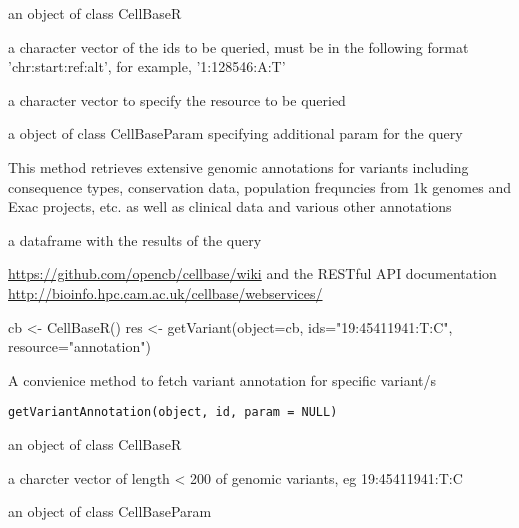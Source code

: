 \documentclass[letterpaper]{book}
\begin{document}
%
\begin{Arguments}
\begin{ldescription}
\item[\code{object}] an object of class CellBaseR

\item[\code{ids}] a character vector of the ids to be queried, must be in the 
following format 'chr:start:ref:alt', for 
example, '1:128546:A:T'

\item[\code{resource}] a character vector to specify the resource to be queried

\item[\code{param}] a object of class CellBaseParam specifying additional param
for the query
\end{ldescription}
\end{Arguments}
%
\begin{Details}\relax
This method retrieves extensive genomic annotations for variants
including consequence types, conservation data, population frequncies from 1k
genomes and Exac projects, etc.
as well as clinical data and various other annotations
\end{Details}
%
\begin{Value}
a dataframe with the results of the query
\end{Value}
%
\begin{SeeAlso}\relax
\url{https://github.com/opencb/cellbase/wiki} 
and the RESTful API documentation 
\url{http://bioinfo.hpc.cam.ac.uk/cellbase/webservices/}
\end{SeeAlso}
%
\begin{Examples}
\begin{ExampleCode}
   cb <- CellBaseR()
   res <- getVariant(object=cb, ids="19:45411941:T:C", resource="annotation")
\end{ExampleCode}
\end{Examples}
%
\begin{Description}\relax
A convienice method to fetch variant annotation for specific variant/s
\end{Description}
%
\begin{Usage}
\begin{verbatim}
getVariantAnnotation(object, id, param = NULL)
\end{verbatim}
\end{Usage}
%
\begin{Arguments}
\begin{ldescription}
\item[\code{object}] an object of class CellBaseR

\item[\code{id}] a charcter vector of length < 200 of genomic variants,
eg 19:45411941:T:C

\item[\code{param}] an object of class CellBaseParam
\end{ldescription}
\end{Arguments}
\end{document}
